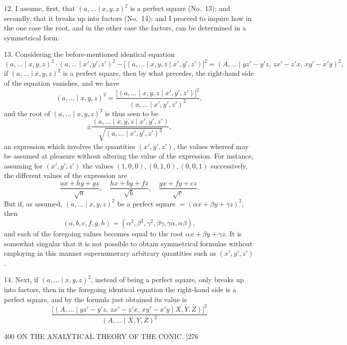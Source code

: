 \documentclass[11pt]{article}
\begin{document}
\textsc{12.} I assume, first, that $(a,\dots \mid x,y,z)^{2}$ is a perfect square (No.~13); and secondly,
that it breaks up into factors (No.~14); and I proceed to inquire how in the one
case the root, and in the other case the factors, can be determined in a symmetrical
form.

\textsc{13.} Considering the before-mentioned identical equation
\[ (a,\dots \mid x,y,z)^{2}\cdot(a,\dots \mid x',y',z')^{2}-\bigl[(a,\dots \mid x,y,z \mid x',y',z')\bigr]^{2}
   =(A,\dots \mid yz'-y'z,\,zx'-z'x,\,xy'-x'y)^{2}, \]
if $(a,\dots \mid x,y,z)^{2}$ is a perfect square, then by what precedes, the right-hand side of
the equation vanishes, and we have
\[ (a,\dots \mid x,y,z)^{2}=\frac{\bigl[(a,\dots \mid x,y,z \mid x',y',z')\bigr]^{2}}{(a,\dots \mid x',y',z')^{2}}, \]
and the root of $(a,\dots \mid x,y,z)^{2}$ is thus seen to be
\[ \pm\frac{(a,\dots \mid x,y,z \mid x',y',z')}{\sqrt{(a,\dots \mid x',y',z')^{2}}}, \]
an expression which involves the quantities $(x',y',z')$, the values whereof may be
assumed at pleasure without altering the value of the expression. For instance, assuming
for $(x',y',z')$ the values $(1,0,0),(0,1,0),(0,0,1)$ successively, the different values of
the expression are
\[ \frac{ax+hy+gz}{\sqrt{a}},\quad \frac{hx+by+fz}{\sqrt{b}},\quad \frac{gx+fy+cz}{\sqrt{c}}. \]
But if, as assumed, $(a,\dots \mid x,y,z)^{2}$ be a perfect square $=(\alpha x+\beta y+\gamma z)^{2}$, then
\[ (a,b,c,f,g,h)=(\alpha^{2},\beta^{2},\gamma^{2},\beta\gamma,\gamma\alpha,\alpha\beta), \]
and each of the foregoing values becomes equal to the root $\alpha x+\beta y+\gamma z$. It is somewhat
singular that it is not possible to obtain symmetrical formulae without employing
in this manner supernumerary arbitrary quantities such as $(x',y',z')$.

\textsc{14.} Next, if $(a,\dots \mid x,y,z)^{2}$, instead of being a perfect square, only breaks up
into factors, then in the foregoing identical equation the right-hand side is a perfect
square, and by the formula just obtained its value is
\[ \frac{\bigl[(A,\dots \mid yz'-y'z,\,zx'-z'x,\,xy'-x'y \mid X,Y,Z)\bigr]^{2}}{(A,\dots \mid X,Y,Z)^{2}} \]

\begin{center}
400 \hfill ON THE ANALYTICAL THEORY OF THE CONIC. \hfill \textsc{[276}
\end{center}
\end{document}
